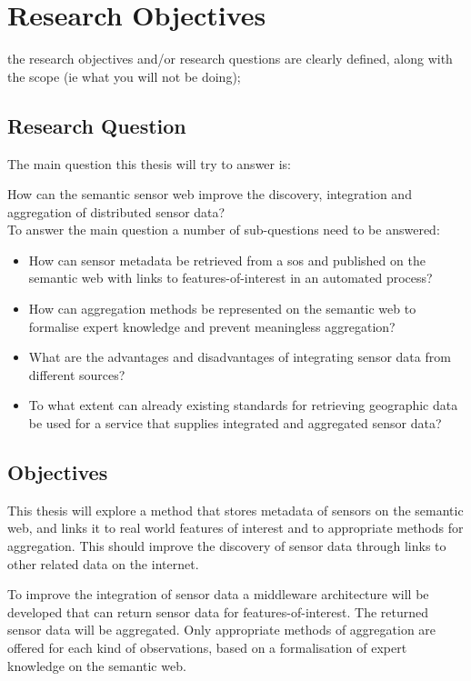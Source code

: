 
\chapter{Research Objectives}
\label{chap:objectives}

the research objectives and/or research questions are clearly defined, along with the scope (ie what you will not be doing);\\

\section{Research Question} 
The main question this thesis will try to answer is: 

How can the semantic sensor web improve the discovery, integration and 
aggregation of distributed sensor data?\\

To answer the main question a number of sub-questions need to be answered:
\begin{itemize}
	\item How can sensor metadata be retrieved from a \ac{sos} and published on the semantic web with links to features-of-interest in an automated process?
	\item How can aggregation methods be represented on the semantic web to formalise expert knowledge and prevent meaningless aggregation?
	\item What are the advantages and disadvantages of integrating sensor data from different sources?
	\item To what extent can already existing standards for retrieving geographic data be used for a service that supplies integrated and aggregated sensor data?
\end{itemize}

\section{Objectives}

This thesis will explore a method that stores metadata of sensors on the semantic web, and links it to real world features of interest and to appropriate methods for aggregation. This should improve the discovery of sensor data through links to other related data on the internet.  

To improve the integration of sensor data a middleware architecture will be developed that can return sensor data for features-of-interest. The returned sensor data will be aggregated. Only appropriate methods of aggregation are offered for each kind of observations, based on a formalisation of expert knowledge on the semantic web.

